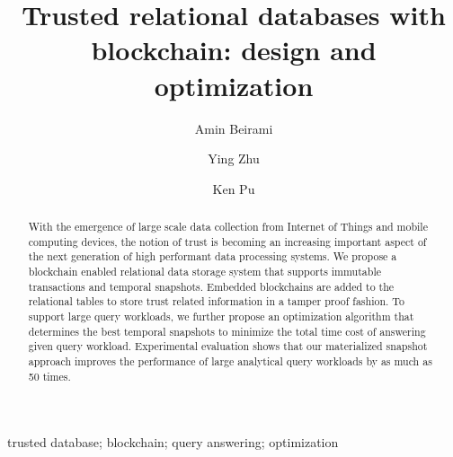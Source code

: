 \title{Trusted relational databases with blockchain: design and optimization}


\author[a]{Amin Beirami}
\author[b]{Ying Zhu}
\author[a]{Ken Pu}

\address[a]{Faculty of Science, UOIT, Oshawa, ON, Canada}
\address[b]{Faculty of Business and IT, UOIT, Oshawa, ON, Canada}

\begin{abstract}
    With the emergence of large scale data collection from Internet of Things
    and mobile computing devices, the notion of trust is becoming an increasing
    important aspect of the next generation of high performant data processing
    systems. We propose a blockchain enabled relational data storage system that
    supports immutable transactions and temporal snapshots.  Embedded
    blockchains are added to the relational tables to store trust related
    information in a tamper proof fashion.
    To support large query workloads, we further propose an optimization
    algorithm that determines the best temporal snapshots to minimize the total
    time cost of answering given query workload. Experimental evaluation
    shows that our materialized snapshot approach improves the performance of
    large analytical query workloads by as much as 50 times.
\end{abstract}

\begin{keyword}
    trusted database; blockchain; query answering; optimization
\end{keyword}

